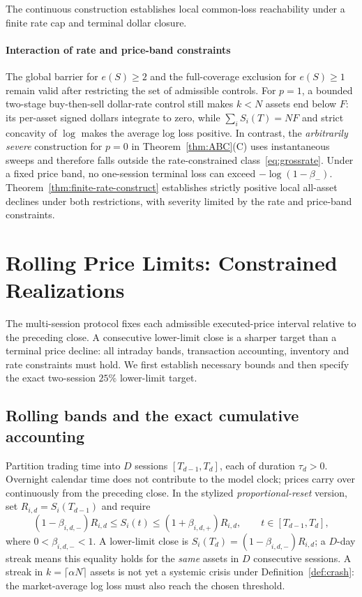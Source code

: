 \documentclass[review,hidelinks,onefignum,onetabnum]{siamonline250211}
\begin{document}
The continuous construction establishes local common-loss reachability under a finite rate cap and terminal dollar closure.

\paragraph{Interaction of rate and price-band constraints}
The global barrier for $e(S)\ge2$ and the full-coverage exclusion for $e(S)\ge1$ remain valid after restricting the set of admissible controls. For $p=1$, a bounded two-stage buy-then-sell dollar-rate control still makes $k<N$ assets end below $F$: its per-asset signed dollars integrate to zero, while $\sum_i S_i(T)=NF$ and strict concavity of $\log$ makes the average log loss positive. In contrast, the \emph{arbitrarily severe} construction for $p=0$ in Theorem~\ref{thm:ABC}(C) uses instantaneous sweeps and therefore falls outside the rate-constrained class~\eqref{eq:grossrate}. Under a fixed price band, no one-session terminal loss can exceed $-\log(1-\beta_-)$. Theorem~\ref{thm:finite-rate-construct} establishes strictly positive local all-asset declines under both restrictions, with severity limited by the rate and price-band constraints.



\section{Rolling Price Limits: Constrained Realizations}\label{sec:multiday}
The multi-session protocol fixes each admissible executed-price interval relative to the preceding close. A consecutive lower-limit close is a sharper target than a terminal price decline: all intraday bands, transaction accounting, inventory and rate constraints must hold. We first establish necessary bounds and then specify the exact two-session $25\%$ lower-limit target.

\subsection{Rolling bands and the exact cumulative accounting}\label{subsec:multiday-protocol}
Partition trading time into $D$ sessions $[T_{d-1},T_d]$, each of duration $\tau_d>0$. Overnight calendar time does not contribute to the model clock; prices carry over continuously from the preceding close. In the stylized \emph{proportional-reset} version, set $R_{i,d}=S_i(T_{d-1})$ and require
\begin{equation}\label{eq:rolling-band}
 (1-\beta_{i,d,-})R_{i,d}\le S_i(t)\le(1+\beta_{i,d,+})R_{i,d},
 \qquad t\in[T_{d-1},T_d],
\end{equation}
where $0<\beta_{i,d,-}<1$. A lower-limit close is
$S_i(T_d)=(1-\beta_{i,d,-})R_{i,d}$; a $D$-day streak means this equality holds for the \emph{same} assets in $D$ consecutive sessions. A streak in $k=\lceil\alpha N\rceil$ assets is not yet a systemic crisis under Definition~\ref{def:crash}: the market-average log loss must also reach the chosen threshold.
\end{document}
